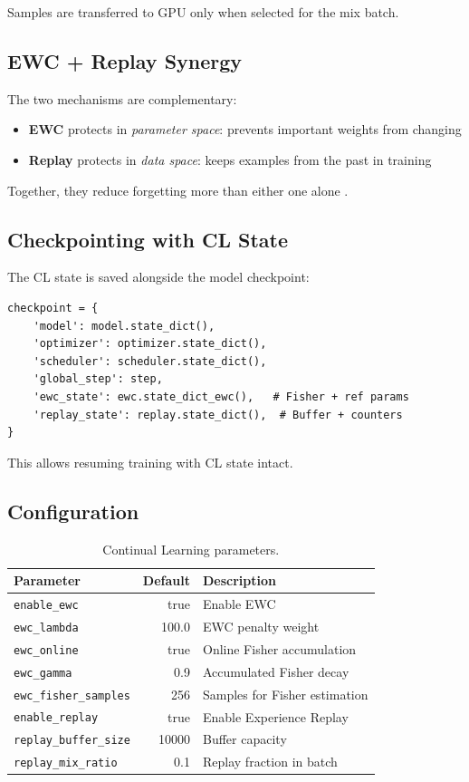 Samples are transferred to GPU only when selected for the mix batch.

\subsection{EWC + Replay Synergy}

The two mechanisms are complementary:

\begin{itemize}
    \item \textbf{EWC} protects in \textit{parameter space}: prevents
    important weights from changing
    \item \textbf{Replay} protects in \textit{data space}: keeps
    examples from the past in training
\end{itemize}

Together, they reduce forgetting more than either one alone
\cite{chaudhry2019continual}.

\subsection{Checkpointing with CL State}

The CL state is saved alongside the model checkpoint:

\begin{lstlisting}[caption={Checkpoint contents.}]
checkpoint = {
    'model': model.state_dict(),
    'optimizer': optimizer.state_dict(),
    'scheduler': scheduler.state_dict(),
    'global_step': step,
    'ewc_state': ewc.state_dict_ewc(),   # Fisher + ref params
    'replay_state': replay.state_dict(),  # Buffer + counters
}
\end{lstlisting}

This allows resuming training with CL state intact.

\subsection{Configuration}

\begin{table}[H]
\centering
\caption{Continual Learning parameters.}
\label{tab:cl_config}
\begin{tabular}{lrl}
\toprule
\textbf{Parameter} & \textbf{Default} & \textbf{Description} \\
\midrule
\texttt{enable\_ewc} & true & Enable EWC \\
\texttt{ewc\_lambda} & 100.0 & EWC penalty weight \\
\texttt{ewc\_online} & true & Online Fisher accumulation \\
\texttt{ewc\_gamma} & 0.9 & Accumulated Fisher decay \\
\texttt{ewc\_fisher\_samples} & 256 & Samples for Fisher estimation \\
\texttt{enable\_replay} & true & Enable Experience Replay \\
\texttt{replay\_buffer\_size} & 10000 & Buffer capacity \\
\texttt{replay\_mix\_ratio} & 0.1 & Replay fraction in batch \\
\bottomrule
\end{tabular}
\end{table}
